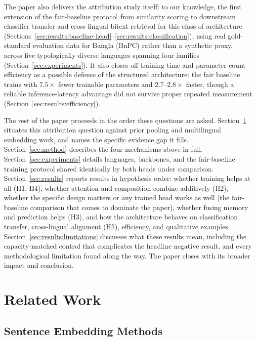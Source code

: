 \documentclass[manuscript]{acmart}
\begin{document}
The paper also delivers the attribution study itself: to our knowledge, the first extension of the fair-baseline protocol from similarity scoring to downstream classifier transfer and cross-lingual bitext retrieval for this class of architecture (Sections~\ref{sec:results:baseline-head}--\ref{sec:results:classification}), using real gold-standard evaluation data for Bangla (BnPC) rather than a synthetic proxy, across five typologically diverse languages spanning four families (Section~\ref{sec:experiments}). It also closes off training-time and parameter-count efficiency as a possible defense of the structured architecture: the fair baseline trains with $7.5\times$ fewer trainable parameters and $2.7$--$2.8\times$ faster, though a reliable inference-latency advantage did not survive proper repeated measurement (Section~\ref{sec:results:efficiency}).

The rest of the paper proceeds in the order these questions are asked. Section~\ref{sec:related} situates this attribution question against prior pooling and multilingual embedding work, and names the specific evidence gap it fills. Section~\ref{sec:method} describes the four mechanisms above in full. Section~\ref{sec:experiments} details languages, backbones, and the fair-baseline training protocol shared identically by both heads under comparison. Section~\ref{sec:results} reports results in hypothesis order: whether training helps at all (H1, H4), whether attention and composition combine additively (H2), whether the specific design matters or any trained head works as well (the fair-baseline comparison that comes to dominate the paper), whether fusing memory and prediction helps (H3), and how the architecture behaves on classification transfer, cross-lingual alignment (H5), efficiency, and qualitative examples. Section~\ref{sec:results:limitations} discusses what these results mean, including the capacity-matched control that complicates the headline negative result, and every methodological limitation found along the way. The paper closes with its broader impact and conclusion.

\section{Related Work}
\label{sec:related}

\subsection{Sentence Embedding Methods}
\end{document}

